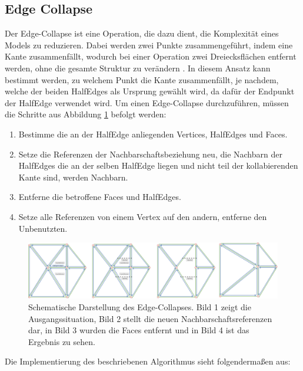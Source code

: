 \subsection{Edge Collapse}
Der Edge-Collapse ist eine Operation, die dazu dient, die Komplexit\"at eines Models zu reduzieren. Dabei werden zwei Punkte zusammengef\"uhrt, indem eine Kante zusammenf\"allt, wodurch bei einer Operation zwei Dreiecksfl\"achen entfernt werden, ohne die gesamte Struktur zu ver\"andern \cite{Castello07}. In diesem Ansatz kann bestimmt werden, zu welchem Punkt die Kante zusammenf\"allt, je nachdem, welche der beiden HalfEdges als Ursprung gew\"ahlt wird, da daf\"ur der Endpunkt der HalfEdge verwendet wird. 
Um einen Edge-Collapse durchzuf\"uhren, m\"ussen die Schritte aus Abbildung \ref{fig:edgecollapse} befolgt werden:
\begin{enumerate}
	\item Bestimme die an der HalfEdge anliegenden Vertices, HalfEdges und Faces.
	\item Setze die Referenzen der Nachbarschaftsbeziehung neu, die Nachbarn der HalfEdges die an der selben HalfEdge liegen und nicht teil der kollabierenden Kante sind, werden Nachbarn.
	\item Entferne die betroffene Faces und HalfEdges.
	\item Setze alle Referenzen von einem Vertex auf den andern, entferne den Unbenutzten.
\end{enumerate}
\begin{figure}[H]
	\centering
	\includegraphics[width=1\linewidth]{Images/EdgeCollapse}
	\caption{Schematische Darstellung des Edge-Collapses. Bild 1 zeigt die Ausgangssituation, Bild 2 stellt die neuen Nachbarschaftsreferenzen dar, in Bild 3 wurden die Faces entfernt und in Bild 4 ist das Ergebnis zu sehen.}
	\label{fig:edgecollapse}
\end{figure}
Die Implementierung des beschriebenen Algorithmus sieht folgenderma{\ss}en aus:
